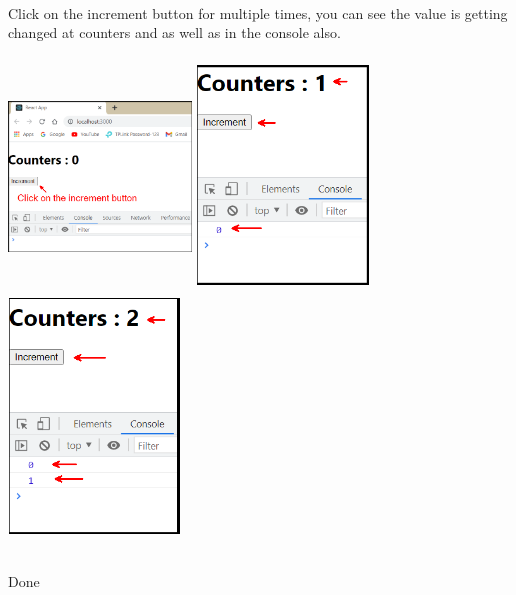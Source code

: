 \documentclass{article}
\begin{document}
\noindent \\
Click on the increment button for multiple times, you can see the value is getting changed at counters and as well as in the console also.

\noindent 

\begin{center}
	\noindent \includegraphics*[width=1.92in, height=2.43in]{IMG-09-41}     
\includegraphics*[width=1.79in, height=2.46in]{IMG-09-42}     
\includegraphics*[width=1.80in, height=2.46in]{IMG-09-43}

\end{center}
\noindent 

\noindent 

\noindent \\
Done
\end{document}
